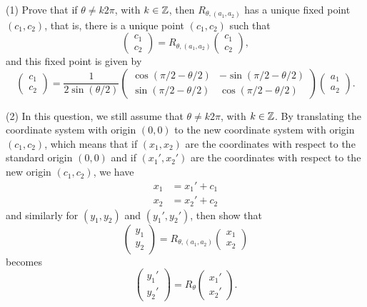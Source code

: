 \documentclass[12pt]{article}
\begin{document}
\medskip
(1)
Prove that if $\theta\not= k 2\pi$, with $k \in \mathbb{Z}$, then  
$R_{\theta, (a_1,a_2)}$ has
a unique fixed point $(c_1, c_2)$, that is, there is a unique
point  $(c_1, c_2)$ such that
\[
\begin{pmatrix}
c_1 \\
c_2
\end{pmatrix} 
=
R_{\theta, (a_1,a_2)}
\begin{pmatrix}
c_1 \\
c_2
\end{pmatrix}, 
\]
and  this fixed point is given by
\[
\begin{pmatrix}
c_1 \\
c_2
\end{pmatrix} 
=
\frac{1}{2\sin(\theta/2)}
\begin{pmatrix}
\cos(\pi/2 - \theta/2) & -\sin(\pi/2 - \theta/2) \\
\sin(\pi/2 -\theta/2) & \cos(\pi/2 - \theta/2)
\end{pmatrix}
\begin{pmatrix}
a_1 \\
a_2
\end{pmatrix}.
\]

\medskip
(2)
In this question, we still assume that
 $\theta\not= k 2\pi$, with $k \in \mathbb{Z}$.
By translating the coordinate system with origin $(0, 0)$
to the new coordinate system with origin $(c_1, c_2)$, which
means that if $(x_1, x_2)$ are the coordinates with respect to the 
standard origin $(0, 0)$ and if $(x_1', x_2')$ are the coordinates with respect 
to the new origin $(c_1, c_2)$,  we have
\begin{align*}
x_1 & = x_1' + c_1 \\
x_2 & = x_2' + c_2
\end{align*}
and similarly for $(y_1, y_2)$ and $(y_1', y_2')$,
then show that 
\[
\begin{pmatrix}
y_1 \\
y_2
\end{pmatrix} 
=
R_{\theta, (a_1,a_2)}
\begin{pmatrix}
x_1 \\
x_2
\end{pmatrix}
\]
becomes
\[
\begin{pmatrix}
y_1' \\
y_2'
\end{pmatrix} 
=
R_{\theta}
\begin{pmatrix}
x_1' \\
x_2'
\end{pmatrix}.
\]
\end{document}
